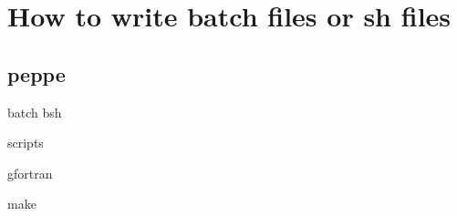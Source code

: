 
\chapter{How to write batch files or sh files  }
\label{batch} 
      
 \section{peppe}     
      batch bsh 
      
      scripts 
      
      
      gfortran 
      
      make 
    
   